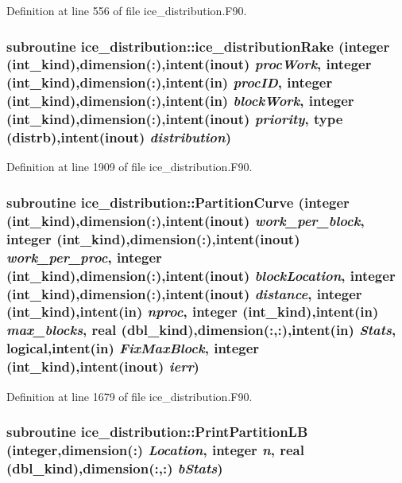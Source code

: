 Definition at line 556 of file ice\_\-distribution.F90.\hypertarget{namespaceice__distribution_aa6d69913a71458cdcb71836b2c12c941}{
\subsubsection[{ice\_\-distributionRake}]{\setlength{\rightskip}{0pt plus 5cm}subroutine ice\_\-distribution::ice\_\-distributionRake (integer (int\_\-kind),dimension(:),intent(inout) {\em procWork}, \/  integer (int\_\-kind),dimension(:),intent(in) {\em procID}, \/  integer (int\_\-kind),dimension(:),intent(in) {\em blockWork}, \/  integer (int\_\-kind),dimension(:),intent(inout) {\em priority}, \/  type (distrb),intent(inout) {\em distribution})}}
\label{namespaceice__distribution_aa6d69913a71458cdcb71836b2c12c941}


Definition at line 1909 of file ice\_\-distribution.F90.\hypertarget{namespaceice__distribution_abcbf14893b6e339874e46663dd6d9640}{
\subsubsection[{PartitionCurve}]{\setlength{\rightskip}{0pt plus 5cm}subroutine ice\_\-distribution::PartitionCurve (integer (int\_\-kind),dimension(:),intent(inout) {\em work\_\-per\_\-block}, \/  integer (int\_\-kind),dimension(:),intent(inout) {\em work\_\-per\_\-proc}, \/  integer (int\_\-kind),dimension(:),intent(inout) {\em blockLocation}, \/  integer (int\_\-kind),dimension(:),intent(inout) {\em distance}, \/  integer (int\_\-kind),intent(in) {\em nproc}, \/  integer (int\_\-kind),intent(in) {\em max\_\-blocks}, \/  real (dbl\_\-kind),dimension(:,:),intent(in) {\em Stats}, \/  logical,intent(in) {\em FixMaxBlock}, \/  integer (int\_\-kind),intent(inout) {\em ierr})}}
\label{namespaceice__distribution_abcbf14893b6e339874e46663dd6d9640}


Definition at line 1679 of file ice\_\-distribution.F90.\hypertarget{namespaceice__distribution_abcbe271722878acfc0ee93ce9d8a1342}{
\subsubsection[{PrintPartitionLB}]{\setlength{\rightskip}{0pt plus 5cm}subroutine ice\_\-distribution::PrintPartitionLB (integer,dimension(:) {\em Location}, \/  integer {\em n}, \/  real (dbl\_\-kind),dimension(:,:) {\em bStats})}}
\label{namespaceice__distribution_abcbe271722878acfc0ee93ce9d8a1342}


